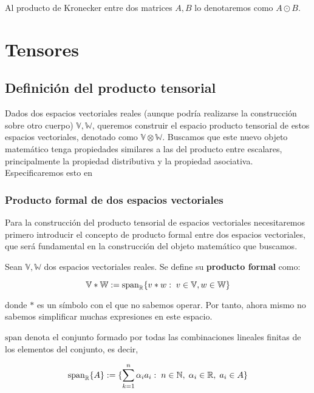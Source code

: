 Al producto de Kronecker entre dos matrices $A, B$ lo denotaremos como $A \odot B$.

\section{Tensores}

\subsection{Definición del producto tensorial} \label{sec:deftensor}

Dados dos espacios vectoriales reales (aunque podría realizarse la construcción sobre otro cuerpo) $\mathbb{V}, \mathbb{W}$, queremos construir el espacio producto tensorial de estos espacios vectoriales, denotado como $\mathbb{V} \otimes \mathbb{W}$. Buscamos que este nuevo objeto matemático tenga propiedades similares a las del producto entre escalares, principalmente la propiedad distributiva y la propiedad asociativa. Especificaremos esto en 

\subsubsection{Producto formal de dos espacios vectoriales}

Para la construcción del producto tensorial de espacios vectoriales necesitaremos primero introducir el concepto de producto formal entre dos espacios vectoriales, que será fundamental en la construcción del objeto matemático que buscamos.

\begin{definicion}
    Sean $\mathbb{V}, \mathbb{W}$ dos espacios vectoriales reales. Se define su \textbf{producto formal} como:

    \begin{equation}
        \mathbb{V} \ast \mathbb{W} := \text{span}_{\mathbb{R}} \{ v \ast w : \; v \in \mathbb{V}, w \in \mathbb{W} \}
    \end{equation}

    donde $*$ es un símbolo con el que no sabemos operar. Por tanto, ahora mismo no sabemos simplificar muchas expresiones en este espacio.
\end{definicion}

\begin{observacion}
    $\text{span}$ denota el conjunto formado por todas las combinaciones lineales finitas de los elementos del conjunto, es decir,

    \begin{equation}
        \text{span}_{\mathbb{R}} \{ A \} := \{ \sum_{k = 1}^n \alpha_i a_i : \; n \in \mathbb{N}, \; \alpha_i \in \mathbb{R}, \; a_i \in A \}
    \end{equation}
\end{observacion}


